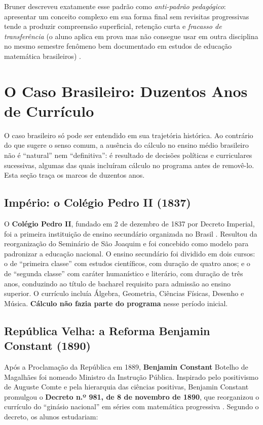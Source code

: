 \documentclass[12pt,a4paper,oneside]{article}
\begin{document}
Bruner descreveu exatamente esse padrão como \emph{anti-padrão
pedagógico}: apresentar um conceito complexo em sua forma final
sem revisitas progressivas tende a produzir compreensão superficial,
retenção curta e \emph{fracasso de transferência} (o aluno aplica
em prova mas não consegue usar em outra disciplina no mesmo
semestre \textemdash{} fenômeno bem documentado em estudos de
educação matemática brasileiros)
\cite{ref:abenge-reprovacao,ref:bruner-1960,ref:rezende-calculo}.

\section{O Caso Brasileiro: Duzentos Anos de Currículo}

O caso brasileiro só pode ser entendido em sua trajetória histórica.
Ao contrário do que sugere o senso comum, a ausência do cálculo no
ensino médio brasileiro não é ``natural'' nem ``definitiva'': é
resultado de decisões políticas e curriculares sucessivas, algumas
das quais incluíram cálculo no programa antes de removê-lo. Esta
seção traça os marcos de duzentos anos.

\subsection{Império: o Colégio Pedro II (1837)}

O \textbf{Colégio Pedro II}, fundado em 2 de dezembro de 1837 por
Decreto Imperial, foi a primeira instituição de ensino secundário
organizada no Brasil \cite{ref:cp2-historico}. Resultou da
reorganização do Seminário de São Joaquim e foi concebido como
modelo para padronizar a educação nacional. O ensino secundário foi
dividido em dois cursos: o de ``primeira classe'' com estudos
científicos, com duração de quatro anos; e o de ``segunda classe''
com caráter humanístico e literário, com duração de três anos,
conduzindo ao título de bacharel \textemdash{} requisito para
admissão ao ensino superior. O currículo incluía Álgebra, Geometria,
Ciências Físicas, Desenho e Música. \textbf{Cálculo não fazia parte
do programa} nesse período inicial.

\subsection{República Velha: a Reforma Benjamin Constant (1890)}

Após a Proclamação da República em 1889, \textbf{Benjamin Constant}
Botelho de Magalhães foi nomeado Ministro da Instrução Pública.
Inspirado pelo positivismo de Auguste Comte e pela hierarquia das
ciências positivas, Benjamin Constant promulgou o
\textbf{Decreto n.º 981, de 8 de novembro de 1890}, que reorganizou
o currículo do ``ginásio nacional'' em séries com matemática
progressiva \cite{ref:reforma-constant,ref:positivismo-cdi}. Segundo
o decreto, os alunos estudariam:
\end{document}
